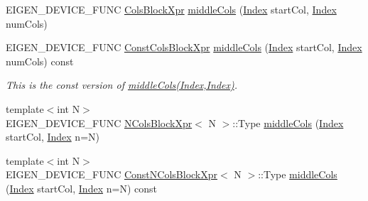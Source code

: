 \begin{DoxyCompactItemize}
E\+I\+G\+E\+N\+\_\+\+D\+E\+V\+I\+C\+E\+\_\+\+F\+U\+NC \mbox{\hyperlink{class_eigen_1_1_block}{Cols\+Block\+Xpr}} \mbox{\hyperlink{class_eigen_1_1_sparse_matrix_base_a8a36ee6b1a072f07bfaaffd69cf31dbd}{middle\+Cols}} (\mbox{\hyperlink{struct_eigen_1_1_eigen_base_a554f30542cc2316add4b1ea0a492ff02}{Index}} start\+Col, \mbox{\hyperlink{struct_eigen_1_1_eigen_base_a554f30542cc2316add4b1ea0a492ff02}{Index}} num\+Cols)
\item 
\mbox{\label{class_eigen_1_1_sparse_matrix_base_a586e95ab75756fa6f5078d134d99ba1e}} 
E\+I\+G\+E\+N\+\_\+\+D\+E\+V\+I\+C\+E\+\_\+\+F\+U\+NC \mbox{\hyperlink{class_eigen_1_1_block}{Const\+Cols\+Block\+Xpr}} \mbox{\hyperlink{class_eigen_1_1_sparse_matrix_base_a586e95ab75756fa6f5078d134d99ba1e}{middle\+Cols}} (\mbox{\hyperlink{struct_eigen_1_1_eigen_base_a554f30542cc2316add4b1ea0a492ff02}{Index}} start\+Col, \mbox{\hyperlink{struct_eigen_1_1_eigen_base_a554f30542cc2316add4b1ea0a492ff02}{Index}} num\+Cols) const
\begin{DoxyCompactList}\small\item\em This is the const version of \mbox{\hyperlink{class_eigen_1_1_sparse_matrix_base_a8a36ee6b1a072f07bfaaffd69cf31dbd}{middle\+Cols(\+Index,\+Index)}}. \end{DoxyCompactList}\item 
{\footnotesize template$<$int N$>$ }\\E\+I\+G\+E\+N\+\_\+\+D\+E\+V\+I\+C\+E\+\_\+\+F\+U\+NC \mbox{\hyperlink{struct_eigen_1_1_sparse_matrix_base_1_1_n_cols_block_xpr}{N\+Cols\+Block\+Xpr}}$<$ N $>$\+::Type \mbox{\hyperlink{class_eigen_1_1_sparse_matrix_base_ac9adf23adf2b74a6fc316d8298d0b210}{middle\+Cols}} (\mbox{\hyperlink{struct_eigen_1_1_eigen_base_a554f30542cc2316add4b1ea0a492ff02}{Index}} start\+Col, \mbox{\hyperlink{struct_eigen_1_1_eigen_base_a554f30542cc2316add4b1ea0a492ff02}{Index}} n=N)
\item 
\mbox{\label{class_eigen_1_1_sparse_matrix_base_a2ddec6853c97bd00adcd251576314098}} 
{\footnotesize template$<$int N$>$ }\\E\+I\+G\+E\+N\+\_\+\+D\+E\+V\+I\+C\+E\+\_\+\+F\+U\+NC \mbox{\hyperlink{struct_eigen_1_1_sparse_matrix_base_1_1_const_n_cols_block_xpr}{Const\+N\+Cols\+Block\+Xpr}}$<$ N $>$\+::Type \mbox{\hyperlink{class_eigen_1_1_sparse_matrix_base_a2ddec6853c97bd00adcd251576314098}{middle\+Cols}} (\mbox{\hyperlink{struct_eigen_1_1_eigen_base_a554f30542cc2316add4b1ea0a492ff02}{Index}} start\+Col, \mbox{\hyperlink{struct_eigen_1_1_eigen_base_a554f30542cc2316add4b1ea0a492ff02}{Index}} n=N) const

\end{DoxyCompactItemize}
